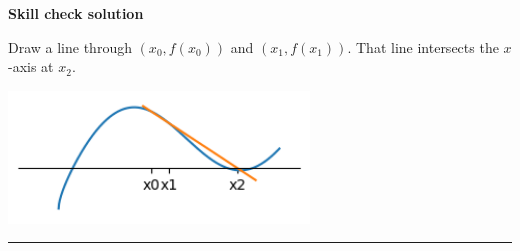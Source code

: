 \documentclass[12pt,letterpaper,noanswers]{exam}
\begin{document}
\noindent \textbf{Skill check solution}
\begin{questions}
\item Draw a line through $(x_0,f(x_0))$ and $(x_1, f(x_1))$.  That line intersects the $x$-axis at $x_2$.

\includegraphics[width=0.6\textwidth]{img/Quiz01secant-soln.png}

\end{questions}
\vspace{0.2cm}
\hrule
\vspace{0.2cm}
\end{document}
